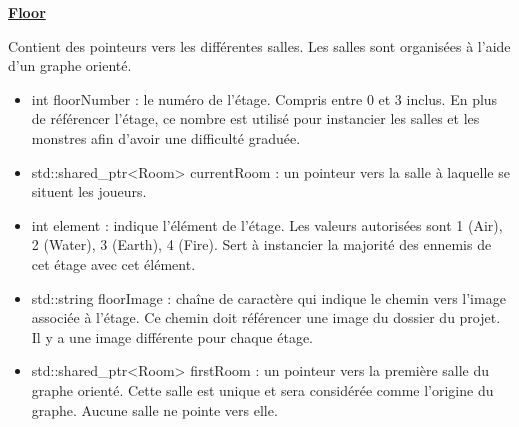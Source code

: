 \underline{\textbf{Floor}}
\par Contient des pointeurs vers les différentes salles. Les salles sont organisées à l'aide d'un graphe orienté.
\begin{itemize}
    \item int floorNumber : le numéro de l'étage. Compris entre 0 et 3 inclus. En plus de référencer l'étage, ce nombre est utilisé pour instancier les salles et les monstres afin d'avoir une difficulté graduée.
    \item std::shared\_ptr<Room> currentRoom : un pointeur vers la salle à laquelle se situent les joueurs.
    \item int element : indique l'élément de l'étage. Les valeurs autorisées sont 1 (Air), 2 (Water), 3 (Earth), 4 (Fire). Sert à instancier la majorité des ennemis de cet étage avec cet élément.
    \item std::string floorImage : chaîne de caractère qui indique le chemin vers l'image associée à l'étage. Ce chemin doit référencer une image du dossier du projet. Il y a une image différente pour chaque étage.
    \item std::shared\_ptr<Room> firstRoom : un pointeur vers la première salle du graphe orienté. Cette salle est unique et sera considérée comme l'origine du graphe. Aucune salle ne pointe vers elle.

\end{itemize}

